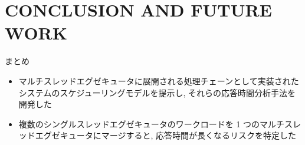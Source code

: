
\section{CONCLUSION AND FUTURE WORK}
\label{sec: conclusion and future work}

\begin{frame}{まとめ}
    \begin{itemize}
        \item マルチスレッドエグゼキュータに展開される処理チェーンとして実装されたシステムのスケジューリングモデルを提示し, それらの応答時間分析手法を開発した
        \item 複数のシングルスレッドエグゼキュータのワークロードを 1 つのマルチスレッドエグゼキュータにマージすると, 応答時間が長くなるリスクを特定した
    \end{itemize}
\end{frame}

